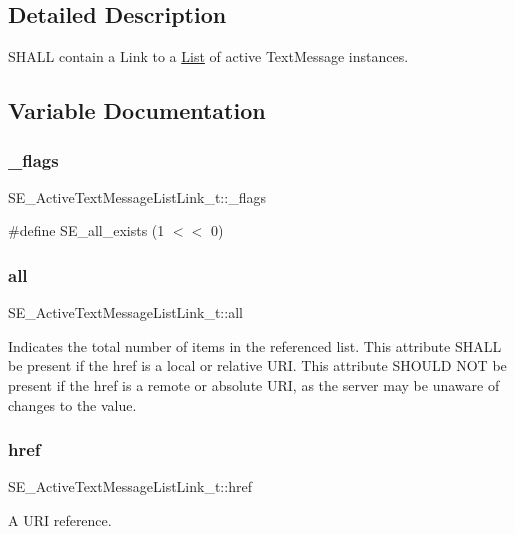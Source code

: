 \subsection{Detailed Description}
S\+H\+A\+LL contain a Link to a \hyperlink{structList}{List} of active Text\+Message instances. 

\subsection{Variable Documentation}
\mbox{\label{group__ActiveTextMessageListLink_ga2bfa632d9e5fe1727367092113aafecf}} 
\subsubsection{\texorpdfstring{\+\_\+flags}{\_flags}}
{\footnotesize\ttfamily S\+E\+\_\+\+Active\+Text\+Message\+List\+Link\+\_\+t\+::\+\_\+flags}

\#define S\+E\+\_\+all\+\_\+exists (1 $<$$<$ 0) \mbox{\label{group__ActiveTextMessageListLink_ga0fe1d2a7f428daddc9a0ca75931c144e}} 
\subsubsection{\texorpdfstring{all}{all}}
{\footnotesize\ttfamily S\+E\+\_\+\+Active\+Text\+Message\+List\+Link\+\_\+t\+::all}

Indicates the total number of items in the referenced list. This attribute S\+H\+A\+LL be present if the href is a local or relative U\+RI. This attribute S\+H\+O\+U\+LD N\+OT be present if the href is a remote or absolute U\+RI, as the server may be unaware of changes to the value. \mbox{\label{group__ActiveTextMessageListLink_gabca12a79cb2612036a2d49ec33f8fa53}} 
\subsubsection{\texorpdfstring{href}{href}}
{\footnotesize\ttfamily S\+E\+\_\+\+Active\+Text\+Message\+List\+Link\+\_\+t\+::href}

A U\+RI reference. 